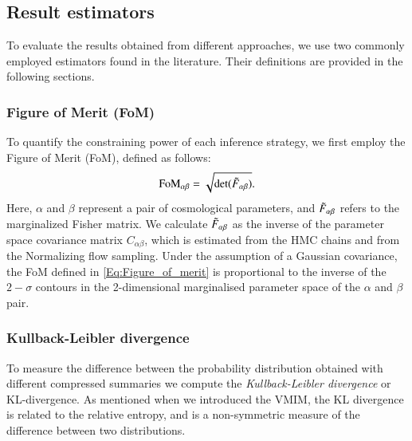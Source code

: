 \documentclass{aa}
\begin{document}
\subsection{Result estimators}
To evaluate the results obtained from different approaches, we use two commonly employed estimators found in the literature. Their definitions are provided in the following sections.
\subsubsection{Figure of Merit (FoM)}
To quantify the constraining power of each inference strategy, we first employ the Figure of Merit (FoM), defined as follows:
\begin{equation}\label{Eq:Figure_of_merit}
    \text{FoM}_{\alpha \beta}=\sqrt{\text{det}(\Tilde{F}_{\alpha \beta})}.
\end{equation}
Here, $\alpha$ and $\beta$ represent a pair of cosmological parameters, and $\Tilde{F}_{\alpha \beta}$ refers to the marginalized Fisher matrix. We calculate $\Tilde{F}_{\alpha \beta}$ as the inverse of the parameter space covariance matrix $C_{\alpha \beta}$, which is estimated from the HMC chains and from the Normalizing flow sampling. 
Under the assumption of a Gaussian covariance, the FoM defined in \autoref{Eq:Figure_of_merit} is proportional to the inverse of the $2-\sigma$ contours in the 2-dimensional marginalised parameter space of the $\alpha$ and $\beta$ pair.
\subsubsection{Kullback-Leibler divergence}
To measure the difference between the probability distribution obtained with different compressed summaries we compute the \textit{Kullback-Leibler divergence} or KL-divergence. As mentioned when we introduced the VMIM, the KL divergence is related to the relative entropy, and is a non-symmetric measure of the difference between two distributions. 
\end{document}
